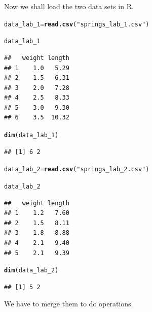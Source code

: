 \documentclass[11pt, a4paper]{article}\usepackage[]{graphicx}\usepackage[]{xcolor}
\makeatletter
\newcommand{\hlstr}[1]{\textcolor[rgb]{0.192,0.494,0.8}{#1}}%
\newcommand{\hlstd}[1]{\textcolor[rgb]{0.345,0.345,0.345}{#1}}%
\newcommand{\hlkwb}[1]{\textcolor[rgb]{0.69,0.353,0.396}{#1}}%
\newcommand{\hlkwd}[1]{\textcolor[rgb]{0.737,0.353,0.396}{\textbf{#1}}}%
\newenvironment{kframe}{%
 \def\at@end@of@kframe{}%
 \ifinner\ifhmode%
  \def\at@end@of@kframe{\end{minipage}}%
  \begin{minipage}{\columnwidth}%
 \fi\fi%
 \def\FrameCommand##1{\hskip\@totalleftmargin \hskip-\fboxsep
 \colorbox{shadecolor}{##1}\hskip-\fboxsep
     \hskip-\linewidth \hskip-\@totalleftmargin \hskip\columnwidth}%
 \MakeFramed {\advance\hsize-\width
   \@totalleftmargin\z@ \linewidth\hsize
   \@setminipage}}%
 {\par\unskip\endMakeFramed%
 \at@end@of@kframe}
\newenvironment{knitrout}{}{} %
\makeatother
\begin{document}
Now we shall load the two data sets in R.

\begin{knitrout}
\color{fgcolor}\begin{kframe}
\begin{alltt}
\hlstd{data_lab_1} \hlkwb{=} \hlkwd{read.csv}\hlstd{(}\hlstr{"springs_lab_1.csv"}\hlstd{)}

\hlstd{data_lab_1}
\end{alltt}
\begin{verbatim}
##   weight length
## 1    1.0   5.29
## 2    1.5   6.31
## 3    2.0   7.28
## 4    2.5   8.33
## 5    3.0   9.30
## 6    3.5  10.32
\end{verbatim}
\begin{alltt}
\hlkwd{dim}\hlstd{(data_lab_1)}
\end{alltt}
\begin{verbatim}
## [1] 6 2
\end{verbatim}
\end{kframe}
\end{knitrout}

\begin{knitrout}
\color{fgcolor}\begin{kframe}
\begin{alltt}
\hlstd{data_lab_2} \hlkwb{=} \hlkwd{read.csv}\hlstd{(}\hlstr{"springs_lab_2.csv"}\hlstd{)}

\hlstd{data_lab_2}
\end{alltt}
\begin{verbatim}
##   weight length
## 1    1.2   7.60
## 2    1.5   8.11
## 3    1.8   8.88
## 4    2.1   9.40
## 5    2.1   9.39
\end{verbatim}
\begin{alltt}
\hlkwd{dim}\hlstd{(data_lab_2)}
\end{alltt}
\begin{verbatim}
## [1] 5 2
\end{verbatim}
\end{kframe}
\end{knitrout}

We have to merge them to do operations.
\end{document}
